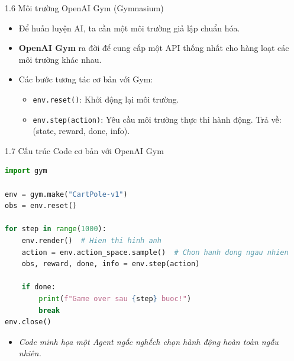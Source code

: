 \documentclass[aspectratio=169, 12pt]{beamer}
\begin{document}
\begin{frame}{1.6 Môi trường OpenAI Gym (Gymnasium)}
    \begin{itemize}
        \item Để huấn luyện AI, ta cần một môi trường giả lập chuẩn hóa.
        \item \textbf{OpenAI Gym} ra đời để cung cấp một API thống nhất cho hàng loạt các môi trường khác nhau.
        \item Các bước tương tác cơ bản với Gym:
        \begin{itemize}
            \item \texttt{env.reset()}: Khởi động lại môi trường.
            \item \texttt{env.step(action)}: Yêu cầu môi trường thực thi hành động. Trả về: (state, reward, done, info).
        \end{itemize}
    \end{itemize}
\end{frame}

\begin{frame}[fragile]{1.7 Cấu trúc Code cơ bản với OpenAI Gym}
\begin{lstlisting}[language=Python]
import gym

env = gym.make("CartPole-v1")
obs = env.reset()

for step in range(1000):
    env.render()  # Hien thi hinh anh
    action = env.action_space.sample()  # Chon hanh dong ngau nhien
    obs, reward, done, info = env.step(action)
    
    if done:
        print(f"Game over sau {step} buoc!")
        break
env.close()
\end{lstlisting}
    \begin{itemize}
        \item \textit{Code minh họa một Agent ngốc nghếch chọn hành động hoàn toàn ngẫu nhiên.}
    \end{itemize}
\end{frame}
\end{document}
